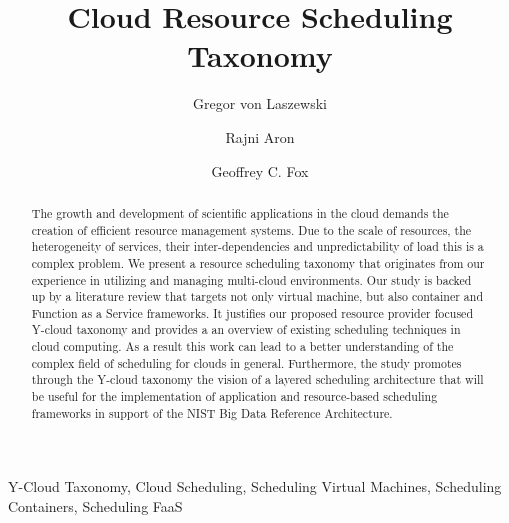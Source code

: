 \documentclass[final,5p,times,twocolumn]{elsarticle}
\author[label1]{Gregor von Laszewski\corref{cor1}\fnref{label3}}
\author[label2]{Rajni Aron}
\author[label1]{Geoffrey C. Fox}
\newcommand{\TITLE}{Cloud Resource Scheduling Taxonomy }
\begin{document}
\onecolumn







\begin{frontmatter}
\title{\TITLE}

\maketitle



\begin{keyword}

  Y-Cloud Taxonomy,
  Cloud Scheduling,
  Scheduling Virtual Machines,
  Scheduling Containers,
  Scheduling FaaS

\end{keyword}

\begin{abstract}

  The growth and development of scientific applications in the cloud
  demands the creation of efficient resource management systems. Due
  to the scale of resources, the heterogeneity of services, their
  inter-dependencies and unpredictability of load this is a complex
  problem. We present a resource scheduling taxonomy that originates
  from our experience in utilizing and managing multi-cloud
  environments.  Our study is backed up by a literature review that
  targets not only virtual machine, but also container and Function as
  a Service frameworks. It justifies our proposed resource provider
  focused Y-cloud taxonomy and provides a an overview of existing
  scheduling techniques in cloud computing.  As a result this work can
  lead to a better understanding of the complex field of scheduling
  for clouds in general. Furthermore, the study promotes through the
  Y-cloud taxonomy the vision of a layered scheduling architecture
  that will be useful for the implementation of application and
  resource-based scheduling frameworks in support of the NIST Big Data
  Reference Architecture.

\end{abstract}

\end{frontmatter}
\end{document}
